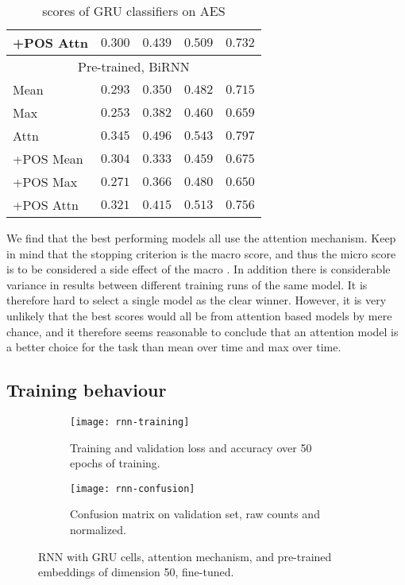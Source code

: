 \begin{table}
\begin{tabular}{lrrrr}
    +POS Attn & $0.300$ & $0.439$ & $0.509$ & $0.732$ \\
    \midrule \multicolumn{5}{c}{Pre-trained, BiRNN} \\ \midrule
    Mean & $0.293$ & $0.350$ & $0.482$ & $0.715$ \\
    Max & $0.253$ & $0.382$ & $0.460$ & $0.659$ \\
    Attn & $0.345$ & $\mathbf{0.496}$ & $0.543$ & $\mathbf{0.797}$ \\
    +POS Mean & $0.304$ & $0.333$ & $0.459$ & $0.675$ \\
    +POS Max & $0.271$ & $0.366$ & $0.480$ & $0.650$ \\
    +POS Attn & $0.321$ & $0.415$ & $0.513$ & $0.756$ \\
    \bottomrule
  \end{tabular}
  \caption{\FI scores of GRU classifiers on AES}
  \label{tab:gru-results}
\end{table}


We find that the best performing models all use the attention mechanism. Keep
in mind that the stopping criterion is the macro \FI score, and thus the
micro \FI score is to be considered a side effect of the macro \FI. In
addition there is considerable variance in results between different training
runs of the same model. It is therefore hard to select a single model as the
clear winner. However, it is very unlikely that the best scores would all be
from attention based models by mere chance, and it therefore seems reasonable
to conclude that an attention model is a better choice for the task than mean
over time and max over time.


\subsection{Training behaviour}

\begin{figure}
  \begin{subfigure}{\linewidth}
    \centering
    \texttt{[image: rnn-training]}
    \caption{Training and validation loss and accuracy over 50 epochs of training.}
  \end{subfigure}
  \begin{subfigure}{\linewidth}
    \centering
    \texttt{[image: rnn-confusion]}
    \caption{Confusion matrix on validation set, raw counts and normalized.}
  \end{subfigure}
  \caption{RNN with GRU cells, attention mechanism, and pre-trained embeddings
           of dimension 50, fine-tuned.}
  \label{fig:rnn-training}
\end{figure}

